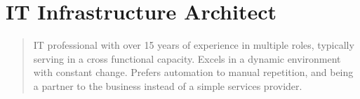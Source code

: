 \section*{IT Infrastructure Architect}
\begin{quote}
IT professional with over 15 years of experience in multiple roles, typically serving in a cross functional capacity.  Excels in a dynamic environment with constant change.  Prefers automation to manual repetition, and being a partner to the business instead of a simple services provider.
\end{quote}

